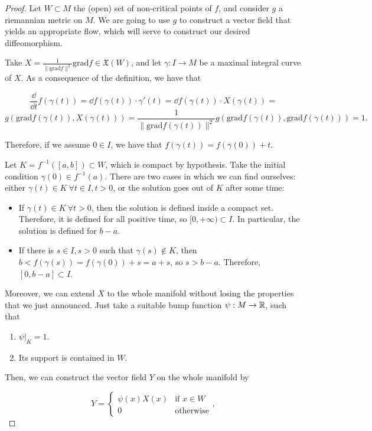\begin{proof}
Let $W \subset M$ the (open) set of non-critical points of $f$, and consider $g$ a riemannian metric on $M$. We are going to use $g$ to construct a vector field that yields an appropriate flow, which will serve to construct our desired diffeomorphism.

Take $X = \frac1{\|\text{grad}f\|^2}\text{grad}f \in \mathfrak{X}(W)$, and let $\gamma : I \rightarrow M$ be a maximal integral curve of $X$. As a consequence of the definition, we have that

$$\frac{\dd}{\dd t} f(\gamma(t)) = \dd f(\gamma(t)) \cdot \gamma'(t) = \dd f(\gamma(t)) \cdot X(\gamma(t)) =$$
$$g\left(\text{grad}f(\gamma(t)),X(\gamma(t))\right) = \frac1{\|\text{grad} f(\gamma(t))\|^2} g(\text{grad} f(\gamma(t)),\text{grad} f(\gamma(t))) = 1 .$$

Therefore, if we assume $0 \in I$, we have that $f(\gamma(t)) = f(\gamma(0)) + t$.

Let $K = f^{-1}([a,b]) \subset W$, which is compact by hypothesis. Take the initial condition $\gamma(0) \in f^{-1}(a)$. There are two cases in which we can find ourselves: either $\gamma(t) \in K \ \forall t \in I, t > 0$, or the solution goes out of $K$ after some time:

\begin{itemize}
	\item If $\gamma(t) \in K \ \forall t > 0$, then the solution is defined inside a compact set. Therefore, it is defined for all positive time, so $[0,+\infty) \subset I$. In particular, the solution is defined for $b-a$.
	\item If there is $s \in I, s > 0$ such that $\gamma(s) \notin K$, then $b < f(\gamma(s)) = f(\gamma(0)) + s = a+s$, so $s > b-a$. Therefore, $[0,b-a] \subset I$.
\end{itemize}

Moreover, we can extend $X$ to the whole manifold without losing the properties that we just announced. Just take a suitable bump function $\psi : M \rightarrow \mathbb{R}$, such that

\begin{enumerate}
	\item $\left. \psi \right|_K = 1$.
	\item Its support is contained in $W$.
\end{enumerate}

Then, we can construct the vector field $Y$ on the whole manifold by

$$Y = \left\{ \begin{array}{ll} \psi(x) X(x) & \text{if } x \in W \\ 0 & \text{otherwise} \end{array} \right. ,$$


\end{proof}
